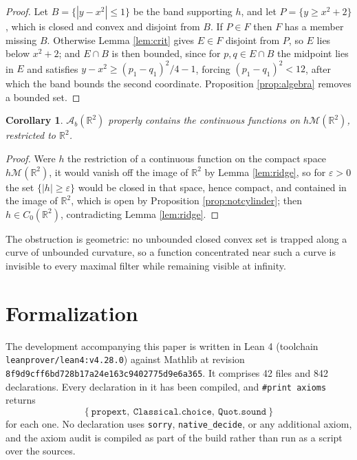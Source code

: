 \documentclass[11pt]{amsart}
\theoremstyle{plain}
\newtheorem{corollary}[theorem]{Corollary}
\theoremstyle{definition}
\newcommand{\AAA}{\mathscr{A}}
\newcommand{\RR}{\mathbb{R}}
\begin{document}
\begin{proof}
Let $B=\{|y-x^{2}|\le1\}$ be the band supporting $h$, and let $P=\{y\ge x^{2}+2\}$, which is closed and convex and disjoint from $B$. If $P\in F$ then $F$ has a member missing $B$. Otherwise Lemma \ref{lem:crit} gives $E\in F$ disjoint from $P$, so $E$ lies below $x^2+2$; and $E\cap B$ is then bounded, since for $p,q\in E\cap B$ the midpoint lies in $E$ and satisfies $y-x^{2}\ge(p_1-q_1)^{2}/4-1$, forcing $(p_1-q_1)^{2}<12$, after which the band bounds the second coordinate. Proposition \ref{prop:algebra} removes a bounded set.
\end{proof}

\begin{corollary}\label{cor:strictly}
$\AAA_b(\RR^2)$ properly contains the continuous functions on $h\mathcal{M}(\RR^2)$, restricted to $\RR^2$.
\end{corollary}

\begin{proof}
Were $h$ the restriction of a continuous function on the compact space $h\mathcal{M}(\RR^2)$, it would vanish off the image of $\RR^2$ by Lemma \ref{lem:ridge}, so for $\varepsilon>0$ the set $\{|h|\ge\varepsilon\}$ would be closed in that space, hence compact, and contained in the image of $\RR^2$, which is open by Proposition \ref{prop:notcylinder}; then $h\in C_0(\RR^2)$, contradicting Lemma \ref{lem:ridge}.
\end{proof}

The obstruction is geometric: no unbounded closed convex set is trapped along a curve of unbounded curvature, so a function concentrated near such a curve is invisible to every maximal filter while remaining visible at infinity.

\appendix

\sloppy
\section{Formalization}\label{app:formal}

The development accompanying this paper \cite{Repo} is written in Lean 4 (toolchain \texttt{leanprover/\allowbreak lean4:v4.28.0}) against Mathlib at revision \texttt{8f9d9cff6bd728b17a\allowbreak 24e163c9402775d\allowbreak 9e6a365}. It comprises 42 files and 842 declarations. Every declaration in it has been compiled, and \texttt{\#print axioms} returns
\[
\{\ \texttt{propext},\ \texttt{Classical.choice},\ \texttt{Quot.sound}\ \}
\]
for each one. No declaration uses \texttt{sorry}, \texttt{native\_decide}, or any additional axiom, and the axiom audit is compiled as part of the build rather than run as a script over the sources.
\end{document}
